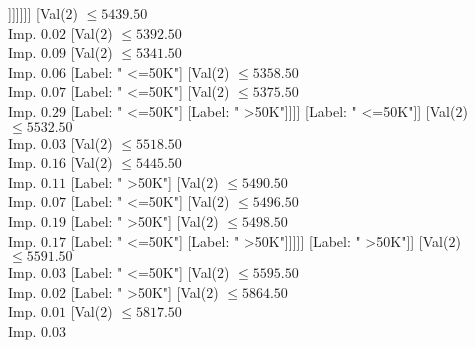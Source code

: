 \documentclass[margin=10pt]{standalone}
\begin{document}
\begin{forest}
																																			[Label: " <=50K"]
																																			[Val($2$) $ \leq 5291.50$ \\ Imp. $0.19$
																																				[Label: " >50K"]
																																				[Label: " <=50K"]]]]]]]
																														[Val($2$) $ \leq 5439.50$ \\ Imp. $0.02$
																															[Val($2$) $ \leq 5392.50$ \\ Imp. $0.09$
																																[Val($2$) $ \leq 5341.50$ \\ Imp. $0.06$
																																	[Label: " <=50K"]
																																	[Val($2$) $ \leq 5358.50$ \\ Imp. $0.07$
																																		[Label: " <=50K"]
																																		[Val($2$) $ \leq 5375.50$ \\ Imp. $0.29$
																																			[Label: " <=50K"]
																																			[Label: " >50K"]]]]
																																[Label: " <=50K"]]
																															[Val($2$) $ \leq 5532.50$ \\ Imp. $0.03$
																																[Val($2$) $ \leq 5518.50$ \\ Imp. $0.16$
																																	[Val($2$) $ \leq 5445.50$ \\ Imp. $0.11$
																																		[Label: " >50K"]
																																		[Val($2$) $ \leq 5490.50$ \\ Imp. $0.07$
																																			[Label: " <=50K"]
																																			[Val($2$) $ \leq 5496.50$ \\ Imp. $0.19$
																																				[Label: " >50K"]
																																				[Val($2$) $ \leq 5498.50$ \\ Imp. $0.17$
																																					[Label: " <=50K"]
																																					[Label: " >50K"]]]]]
																																	[Label: " >50K"]]
																																[Val($2$) $ \leq 5591.50$ \\ Imp. $0.03$
																																	[Label: " <=50K"]
																																	[Val($2$) $ \leq 5595.50$ \\ Imp. $0.02$
																																		[Label: " >50K"]
																																		[Val($2$) $ \leq 5864.50$ \\ Imp. $0.01$
																																			[Val($2$) $ \leq 5817.50$ \\ Imp. $0.03$

\end{forest}
\end{document}
